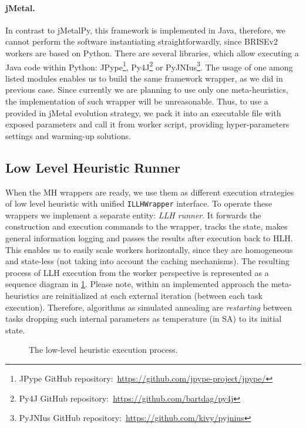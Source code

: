 \paragraph{jMetal.} In contrast to jMetalPy, this framework is implemented in Java, therefore, we cannot perform the software instantiating straightforwardly, since BRISEv2 workers are based on Python. There are several libraries, which allow executing a Java code within Python: JPype\footnote{JPype GitHub repository:~\url{https://github.com/jpype-project/jpype/}}, Py4J\footnote{Py4J GitHub repository:~\url{https://github.com/bartdag/py4j}} or PyJNIus\footnote{PyJNIus GitHub repository:~\url{https://github.com/kivy/pyjnius}}. The usage of one among listed modules enables us to build the same framework wrapper, as we did in previous case. Since currently we are planning to use only one meta-heuristics, the implementation of such wrapper will be unreasonable. Thus, to use a provided in jMetal evolution strategy, we pack it into an executable file with exposed parameters and call it from worker script, providing hyper-parameters settings and warming-up solutions.

\subsection{Low Level Heuristic Runner}
When the MH wrappers are ready, we use them as different execution strategies of low level heuristic with unified \texttt{ILLHWrapper} interface. To operate these wrappers we implement a separate entity: \emph{LLH runner}. It forwards the construction and execution commands to the wrapper, tracks the state, makes general information logging and passes the results after execution back to HLH. This enables us to easily scale workers horizontally, since they are homogeneous and state-less (not taking into account the caching mechanisms). The resulting process of LLH execution from the worker perspective is represented as a sequence diagram in \cref{impl:pict:llh sequence diagram}. Please note, within an implemented approach the meta-heuristics are reinitialized at each external iteration (between each task execution). Therefore, algorithms as simulated annealing are \emph{restarting} between tasks dropping such internal parameters as temperature (in SA) to its initial state.

\begin{figure}
	\centering
	
	\caption{The low-level heuristic execution process.}
	\label{impl:pict:llh sequence diagram}
\end{figure}

